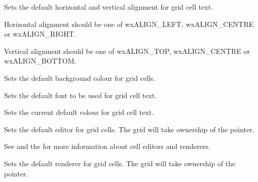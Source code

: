 \label{wxgridsetdefaultcellalignment}


Sets the default horizontal and vertical alignment for grid cell text.

Horizontal alignment should be one of wxALIGN\_LEFT, wxALIGN\_CENTRE or wxALIGN\_RIGHT.

Vertical alignment should be one of wxALIGN\_TOP, wxALIGN\_CENTRE or wxALIGN\_BOTTOM.



\label{wxgridsetdefaultcellbackgroundcolour}


Sets the default background colour for grid cells.



\label{wxgridsetdefaultcellfont}


Sets the default font to be used for grid cell text.



\label{wxgridsetdefaultcelltextcolour}


Sets the current default colour for grid cell text.



\label{wxgridsetdefaulteditor}


Sets the default editor for grid cells. The grid will take ownership of the pointer.

See  and
the  for more information about cell editors and renderers.



\label{wxgridsetdefaultrenderer}


Sets the default renderer for grid cells. The grid will take ownership of the pointer.

